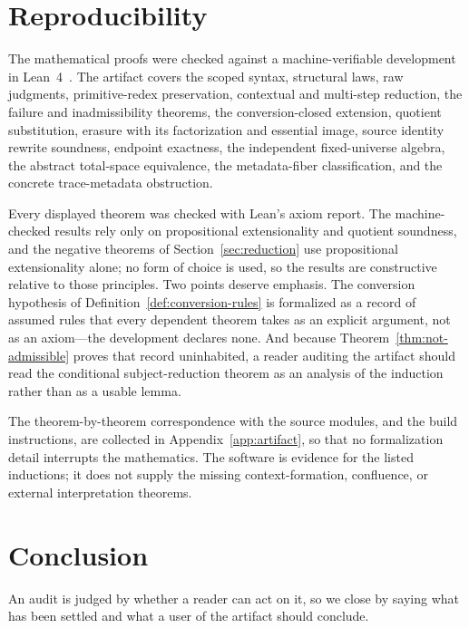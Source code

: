 \documentclass[10pt,reqno]{amsart}
\begin{document}
\section{Reproducibility}
\label{sec:reproducibility}

The mathematical proofs were checked against a machine-verifiable
development in Lean~4~\cite{deMouraUllrich2021,ScopedTraceSoftware2026}.
The artifact covers the scoped syntax, structural laws, raw judgments,
primitive-redex preservation, contextual and multi-step reduction, the failure
and inadmissibility theorems, the conversion-closed extension, quotient
substitution, erasure with its factorization and essential image, source identity rewrite soundness, endpoint exactness, the
independent fixed-universe algebra, the abstract total-space equivalence, the
metadata-fiber classification, and the concrete trace-metadata obstruction.

Every displayed theorem was checked with Lean's axiom report.  The
machine-checked results rely only on propositional extensionality and quotient
soundness, and the negative theorems of Section~\ref{sec:reduction} use
propositional extensionality alone; no form of choice is used, so the results
are constructive relative to those principles.  Two points deserve emphasis.
The conversion hypothesis of Definition~\ref{def:conversion-rules} is formalized
as a record of assumed rules that every dependent theorem takes as an explicit
argument, not as an axiom---the development declares none.  And because
Theorem~\ref{thm:not-admissible} proves that record uninhabited, a reader
auditing the artifact should read the conditional subject-reduction theorem as an
analysis of the induction rather than as a usable lemma.

The theorem-by-theorem correspondence with the source modules, and the build
instructions, are collected in Appendix~\ref{app:artifact}, so that no
formalization detail interrupts the mathematics.  The software is evidence for
the listed inductions; it does not supply the missing context-formation,
confluence, or external interpretation theorems.

\section{Conclusion}
\label{sec:conclusion}

An audit is judged by whether a reader can act on it, so we close by saying
what has been settled and what a user of the artifact should conclude.
\end{document}
